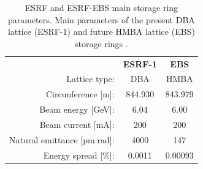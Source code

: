 \documentclass{iucr}              %
\newcommand{\todo}[1]{{\color{red}[TODO: "#1'']}}
\begin{document}
\begin{table}\label{tab:TableSources}
    \caption{ESRF and ESRF-EBS main storage ring parameters. Main parameters of the present DBA lattice (ESRF-1) and future HMBA lattice (EBS) storage rings \cite{orangebook}.}
        \begin{tabular}{rcc}
                                              & \textbf{ESRF-1} & \textbf{EBS}      \\ 
        Lattice type:                         & DBA           & HMBA              \\
        Circunference {[}m{]}:                & 844.930       & 843.979           \\
        Beam energy {[}GeV{]}:                & 6.04          & 6.00              \\
        Beam current {[}mA{]}:                & 200           & 200               \\
        Natural emittance {[}pm$\cdot$rad{]}: & 4000          & 147               \\
        Energy spread {[}$\%${]}:             & 0.0011        & 0.00093           \\       
    \end{tabular}
\end{table}

\begin{table}\label{tab:eBeam}
    \centering
    \caption{ESRF-1 and EBS main electron beam parameters. Electron beam parameters for the high-$\beta$ (labelled ESRF) and the EBS straight sections. Values taken at the symmetry point of the straight section, where the insertion devices are placed. Values for ESRF are taken from \cite{ESRF2014}. For EBS, two (very close) design values are used, from Ref.~\cite{ESRF2014} labelled EBS-S28A, and those coming from further lattice refinement, labelled EBS-S28D. \todo{Remove ESRF-AT and EBS-S28A} }
\end{table}
\end{document}
